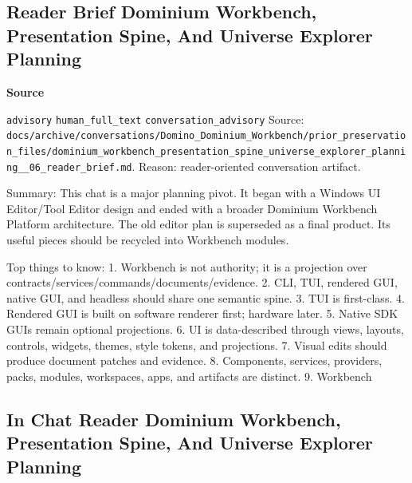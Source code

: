 \documentclass[9pt,a4paper,openany]{book}
\newcommand{\vonecallout}[3]{\par\medskip\noindent\begingroup\setlength{\fboxsep}{7pt}\colorbox{DomCalloutBg}{\parbox{0.94\linewidth}{\textbf{\textcolor{#1}{#2}}\par #3}}\endgroup\par\medskip}
\begin{document}
\subsection{Reader Brief Dominium Workbench, Presentation Spine, And Universe Explorer Planning}

\vonecallout{DomSlate}{Source}{\texttt{advisory} \texttt{human\_\allowbreak{}full\_\allowbreak{}text} \texttt{conversation\_\allowbreak{}advisory} Source: \texttt{docs/\allowbreak{}archive/\allowbreak{}conversations/\allowbreak{}Domino\_\allowbreak{}Dominium\_\allowbreak{}Workbench/\allowbreak{}prior\_\allowbreak{}preservation\_\allowbreak{}files/\allowbreak{}dominium\_\allowbreak{}workbench\_\allowbreak{}presentation\_\allowbreak{}spine\_\allowbreak{}universe\_\allowbreak{}explorer\_\allowbreak{}planning\_\allowbreak{}\_\allowbreak{}06\_\allowbreak{}reader\_\allowbreak{}brief.\allowbreak{}md}.\allowbreak{} Reason: reader-\allowbreak{}oriented conversation artifact.\allowbreak{}}

Summary: This chat is a major planning pivot.\allowbreak{} It began with a Windows UI Editor/\allowbreak{}Tool Editor design and ended with a broader Dominium Workbench Platform architecture.\allowbreak{} The old editor plan is superseded as a final product.\allowbreak{} Its useful pieces should be recycled into Workbench modules.\allowbreak{}


Top things to know: 1.\allowbreak{} Workbench is not authority; it is a projection over contracts/\allowbreak{}services/\allowbreak{}commands/\allowbreak{}documents/\allowbreak{}evidence.\allowbreak{} 2.\allowbreak{} CLI, TUI, rendered GUI, native GUI, and headless should share one semantic spine.\allowbreak{} 3.\allowbreak{} TUI is first-\allowbreak{}class.\allowbreak{} 4.\allowbreak{} Rendered GUI is built on software renderer first; hardware later.\allowbreak{} 5.\allowbreak{} Native SDK GUIs remain optional projections.\allowbreak{} 6.\allowbreak{} UI is data-\allowbreak{}described through views, layouts, controls, widgets, themes, style tokens, and projections.\allowbreak{} 7.\allowbreak{} Visual edits should produce document patches and evidence.\allowbreak{} 8.\allowbreak{} Components, services, providers, packs, modules, workspaces, apps, and artifacts are distinct.\allowbreak{} 9.\allowbreak{} Workbench



\subsection{In Chat Reader Dominium Workbench, Presentation Spine, And Universe Explorer Planning}
\end{document}
